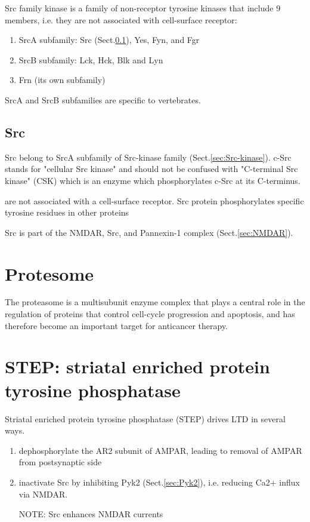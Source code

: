Src family kinase is a family of non-receptor tyrosine kinases that include 9
members, i.e. they are not associated with cell-surface receptor:
\begin{enumerate}
  \item SrcA subfamily: Src (Sect.\ref{sec:Src}), Yes,  Fyn, and Fgr
  \item SrcB subfamily: Lck, Hck, Blk and Lyn
  \item Frn (its own subfamily)
\end{enumerate}
SrcA and SrcB subfamilies are specific to vertebrates.

\subsection{Src}
\label{sec:Src}

Src belong to SrcA subfamily of Src-kinase family (Sect.\ref{sec:Src-kinase}).
c-Src stands for "cellular Src kinase" and should not be confused with
"C-terminal Src kinase" (CSK) which is an enzyme which phosphorylates c-Src at
its C-terminus.

are not associated with a cell-surface receptor.
Src protein phosphorylates specific tyrosine residues in other proteins

Src is part of the NMDAR, Src, and Pannexin-1 complex (Sect.\ref{sec:NMDAR}).

\section{Protesome}
\label{sec:protesome}


The proteasome is a multisubunit enzyme complex that plays a central role in the
regulation of proteins that control cell-cycle progression and apoptosis, and
has therefore become an important target for anticancer therapy.

\section{STEP: striatal enriched protein tyrosine phosphatase}
\label{sec:STEP}

Striatal enriched protein tyrosine phosphatase (STEP) 
drives LTD in several ways.

\begin{enumerate}
  \item dephosphorylate the AR2 subunit of AMPAR, leading to removal of AMPAR
  from postsynaptic side
  
  \item inactivate Src by inhibiting Pyk2 (Sect.\ref{sec:Pyk2}), i.e. reducing
  Ca2+ influx via NMDAR.

NOTE: Src enhances NMDAR currents

  
\end{enumerate}

